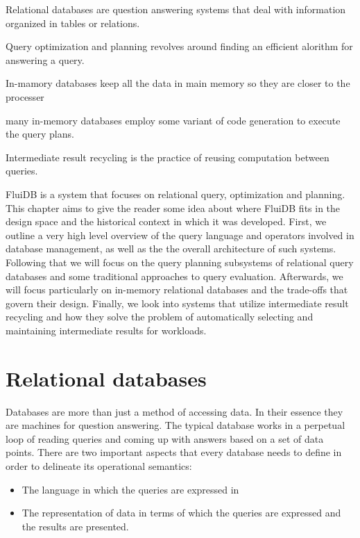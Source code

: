 
\begin{summary}
\item Relational databases are question answering systems that deal
  with information organized in tables or relations.
\item Query optimization and planning revolves around finding an
  efficient alorithm for answering a query.
\item In-mamory databases keep all the data in main memory so they are
  closer to the processer
\item many in-memory databases employ some variant of code generation
  to execute the query plans.
\item Intermediate result recycling is the practice of reusing
  computation between queries.
\end{summary}

FluiDB is a system that focuses on relational query, optimization and
planning. This chapter aims to give the reader some idea about where
FluiDB fits in the design space and the historical context in which
it was developed.  First, we outline a very high level overview of the
query language and operators involved in database management, as well
as the the overall architecture of such systems. Following that we
will focus on the query planning subsystems of relational query
databases and some traditional approaches to query
evaluation. Afterwards, we will focus particularly on in-memory
relational databases and the trade-offs that govern their
design. Finally, we look into systems that utilize intermediate result
recycling and how they solve the problem of automatically selecting
and maintaining intermediate results for workloads.

\section{Relational databases}

Databases are more than just a method of accessing data. In their
essence they are machines for question answering. The typical database
works in a perpetual loop of reading queries and coming up with
answers based on a set of data points. There are two important aspects
that every database needs to define in order to delineate its
operational semantics:

\begin{itemize}
\item The language in which the queries are expressed in
\item The representation of data in terms of which the queries are
  expressed and the results are presented.
\end{itemize}


